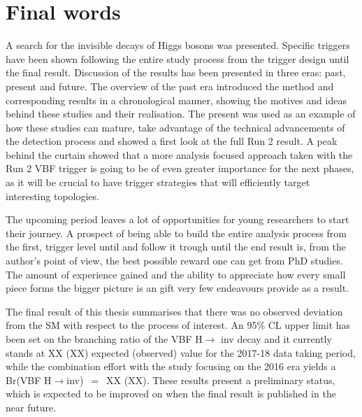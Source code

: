 \section{Final words}
\hspace{10pt} A search for the invisible decays of Higgs bosons was presented. Specific triggers have been shown following the entire study process from the trigger design until the final result. Discussion of the results has been presented in three eras: past, present and future. The overview of the past era introduced the method and corresponding results in a chronological manner, showing the motives and ideas behind these studies and their realisation. The present was used as an example of how these studies can mature, take advantage of the technical advancements of the detection process and showed a first look at the full Run 2 result. A peak behind the curtain showed that a more analysis focused approach taken with the Run 2 VBF trigger is going to be of even greater importance  for the next phases, as it will be crucial to have trigger strategies that will efficiently target interesting topologies.

\hspace{10pt} The upcoming period leaves a lot of opportunities for young researchers to start their journey. A prospect of being able to build the entire analysis process from the first, trigger level until and follow it trough until the end result is, from the author's point of view, the best possible reward one can get from PhD studies. The amount of experience gained and the ability to appreciate how every small piece forms the bigger picture is an gift very few endeavours provide as a result.

\hspace{10pt} The final result of this thesis summarises that there was no observed deviation from the SM with respect to the process of interest. An 95\% CL upper limit has been set on the branching ratio of the VBF H$\rightarrow$ inv decay and it currently stands at XX (XX) expected (observed) value for the 2017-18 data taking period, while the combination effort with the study focusing on the 2016 era yields a Br(VBF H$\rightarrow$inv)~$=$~XX (XX). These results present a preliminary status, which is expected to be improved on when the final result is published in the near future.